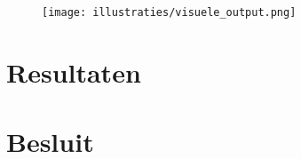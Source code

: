 \documentclass[12pt,a4paper]{article}
\begin{document}
\begin{figure}[H]
  \centering
  \texttt{[image: illustraties/visuele\_output.png]}
\end{figure}

\section{Resultaten}

\section{Besluit}

\listoftodos
\end{document}
